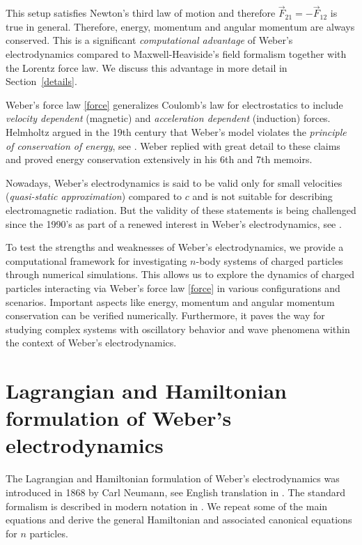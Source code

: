 \documentclass[12pt,a4paper]{article}
\theoremstyle{definition}
\theoremstyle{remark}
\begin{document}
This setup satisfies Newton's third law of motion and therefore $\vec{F}_{21} = -\vec{F}_{12}$ is true in general. Therefore, energy, momentum and angular momentum are always conserved. This is a significant \textit{computational advantage} of Weber's electrodynamics compared to Maxwell-Heaviside's field formalism together with the Lorentz force law. We discuss this advantage in more detail in Section~\ref{details}.

Weber's force law \eqref{force} generalizes Coulomb's law for electrostatics to include \textit{velocity dependent} (magnetic) and \textit{acceleration dependent} (induction) forces. Helmholtz argued in the 19th century that Weber's model violates the \textit{principle of conservation of energy}, see \citet{assis-weber-vol4}. Weber replied with great detail to these claims and proved energy conservation extensively in his 6th and 7th memoirs. \citep{}

Nowadays, Weber's electrodynamics is said to be valid only for small velocities (\textit{quasi-static approximation}) compared to $c$ and is not suitable for describing electromagnetic radiation. But the validity of these statements is being challenged since the 1990's as part of a renewed interest in Weber's electrodynamics, see \citep{}.

To test the strengths and weaknesses of Weber's electrodynamics, we provide a computational framework for investigating $n$-body systems of charged particles through numerical simulations. This allows us to explore the dynamics of charged particles interacting via Weber's force law \eqref{force} in various configurations and scenarios. Important aspects like energy, momentum and angular momentum conservation can be verified numerically. Furthermore, it paves the way for studying complex systems with oscillatory behavior and wave phenomena within the context of Weber's electrodynamics.

\section{Lagrangian and Hamiltonian formulation of Weber's electrodynamics}\label{LH}
The Lagrangian and Hamiltonian formulation of Weber's electrodynamics was introduced in 1868 by Carl Neumann, see English translation in \citep{assis-weber-vol4}. The standard formalism is described in modern notation in \citet{assis-weber}. We repeat some of the main equations and derive the general Hamiltonian and associated canonical equations for $n$ particles.
\end{document}
